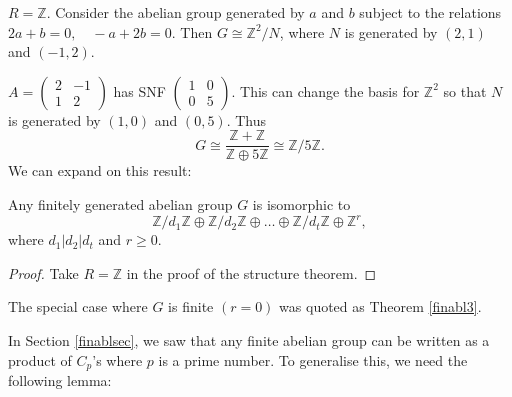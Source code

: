 \documentclass[egregdoesnotlikesansseriftitles,a4paper]{scrartcl}
\begin{document}
\begin{example*}
        $R=\mathbb{Z}$. Consider the abelian group generated by $a$ and $b$ subject to the relations $2a+b =0, \quad -a +2b=0$. Then $G \cong \mathbb{Z}^2/N$, where $N$ is generated by $(2,1)$ and $(-1,2)$.

        $A = \begin{pmatrix} 2 &-1\\1&2 \end{pmatrix}$ has SNF $\begin{pmatrix} 1&0\\0&5 \end{pmatrix}$. This can change the basis for $\mathbb{Z}^2$ so that $N$ is generated by $(1,0)$ and $(0,5)$. Thus \[
        G \cong \frac{\mathbb{Z}+\mathbb{Z}}{\mathbb{Z}\oplus 5\mathbb{Z}} \cong \mathbb{Z}/5\mathbb{Z}
        .\] We can expand on this result:
        \begin{theorem}
                Any finitely generated abelian group $G$ is isomorphic to \[
                \mathbb{Z}/d_1 \mathbb{Z} \oplus \mathbb{Z}/d_2 \mathbb{Z} \oplus \ldots \oplus \mathbb{Z}/d_{t}\mathbb{Z} \oplus \mathbb{Z}^{r}
                ,\] where $d_1 | d_2 |d_{t}$ and $r \geq 0$.
                \begin{proof}
                        Take $R=\mathbb{Z}$ in the proof of the structure theorem.
                \end{proof}
                \begin{remark}
                        The special case where $G$ is finite $(r=0)$ was quoted as Theorem \ref{finabl3}.

                        
                \end{remark}
        \end{theorem}
\end{example*}
In Section \ref{finablsec}, we saw that any finite abelian group can be written as a product of $C_{p}$'s where $p $ is a prime number. To generalise this, we need the following lemma:
\end{document}
